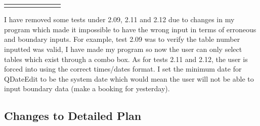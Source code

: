 \begin{landscape}
\begin{center}
\begin{longtable}{|p{1.5cm}|p{2.5cm}|p{2.5cm}|p{2cm}|p{2cm}|p{2cm}|p{2cm}|p{2cm}|}
{    \end{longtable}
\end{center}
	I have removed some tests under 2.09, 2.11 and 2.12 due to changes in my program which made it impossible to have the wrong input in terms of erroneous and boundary inputs. For example, test 2.09 was to verify the table number inputted was valid, I have made my program so now the user can only select tables which exist through a combo box. As for tests 2.11 and 2.12, the user is forced into using the correct times/dates format. I set the minimum date for QDateEdit to be the system date which would mean the user will not be able to input boundary data (make a booking for yesterday).

\subsection{Changes to Detailed Plan}


\end{landscape}
